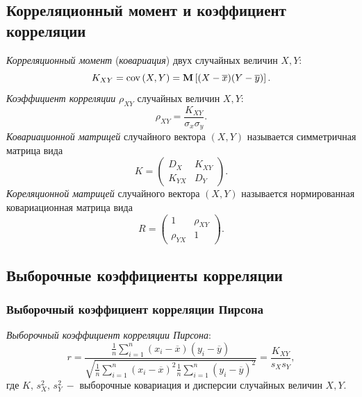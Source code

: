 \documentclass[a4paper]{article}
\begin{document}
\subsection{Корреляционный момент и коэффициент корреляции}
\textit{Корреляционный момент} (\textit{ковариация}) двух случайных величин $X, Y$:
\begin{equation}
    K_{XY} = \operatorname{cov}{(X,Y)}=\mathbf{M}\left[(X-\overline{x})(Y-\overline{y})\right].
\end{equation}
\textit{Коэффициент корреляции} $\rho_{XY}$ случайных величин $X,Y$:
\begin{equation}\label{eq::rho}
    \rho_{XY}^{}=\frac{K_{XY}}{\sigma_x\sigma_y}.
\end{equation}
\textit{Ковариационной матрицей} случайного вектора $(X,Y)$ называется симметричная матрица вида
\begin{equation}
    K=\begin{pmatrix}
    D_X & K_{XY} \\
    K_{YX} & D_Y
    \end{pmatrix}.
\end{equation}
\textit{Кореляционной матрицей} случайного вектора $(X,Y)$ называется нормированная ковариационная матрица вида
\begin{equation}
    R=\begin{pmatrix}
    1 & \rho_{XY}^{} \\
    \rho_{YX}^{} & 1
    \end{pmatrix}.
\end{equation}
\subsection{Выборочные коэффициенты корреляции}
\subsubsection{Выборочный коэффициент корреляции Пирсона}
\textit{Выборочный коэффициент корреляции Пирсона}:
\begin{equation}\label{eq::pirs}
    r=\frac{\frac{1}{n}\sum_{i=1}^n \left(x_i-\overline{x}\right)\left(y_i-\overline{y}\right)}{\sqrt{\frac{1}{n}\sum_{i=1}^n\left(x_i-\overline{x}\right)^2 \frac{1}{n}\sum_{i=1}^n\left(y_i-\overline{y}\right)^2}}=\frac{K_{XY}}{s_X s_Y},
\end{equation}
где $K,\,s_X^2,\,s_Y^2\:-$ выборочные ковариация и дисперсии случайных величин $X, Y$.
\end{document}
